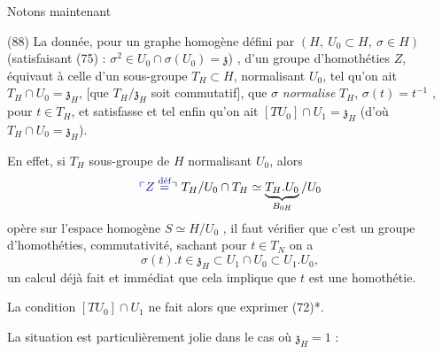 \documentclass[11pt,a4paper]{article}
\begin{document}
Notons maintenant

(88) La donnée, \add{*} pour un graphe homogène défini par $(H,\ U_0\subset H,\ \sigma\in H)$
(satisfaisant (75) : $\sigma^2\in U_0\cap\sigma(U_0) = \mathfrak{z}$) , d'un groupe d'homothéties $Z$, équivaut à celle d'un sous-groupe $T_H\subset H$,
normalisant $U_0$, tel qu'on ait $T_H\cap U_0 = \mathfrak{z}_H$, [que $T_H/\mathfrak{z}_H$ soit
commutatif],  que $\sigma$ \emph{normalise} $T_H$, $\sigma(t) = t^{-1}$
 \struck{\ill{}}, pour $t\in T_H$, et  satisfasse et tel
enfin qu'on ait $[T U_0]\cap U_1 = \mathfrak{z}_H$ (d'où \struck{\ill{}} $T_H\cap U_0 = \mathfrak{z}_H$).



En effet, si $T_H$  \ill{} sous-groupe de $H$
normalisant $U_0$, alors
\[
\text{\add{$Z \stackrel{\text{déf}}{=}$}}\ T_H / U_0\cap T_H \simeq \underbrace{T_H.U_0}_{B_{0H}} / U_0
\]
opère  sur l'espace homogène $S\simeq H/U_0$ , il faut vérifier
que c'est un groupe d'homothéties, \add{\ill{}}  commutativité, sachant 
pour $t\in T_N$ on a
\[
\sigma(t).t \in \mathfrak{z}_H \subset U_1\cap U_0 \subset U_1.U_0 ,
\]
un calcul déjà fait et immédiat  que cela implique que $t$ est une
homothétie.   


La condition $[TU_0]\cap U_1$ ne fait alors que exprimer (72)*.

La situation est particulièrement jolie dans le cas où $\mathfrak{z}_H = 1$ :
\end{document}
